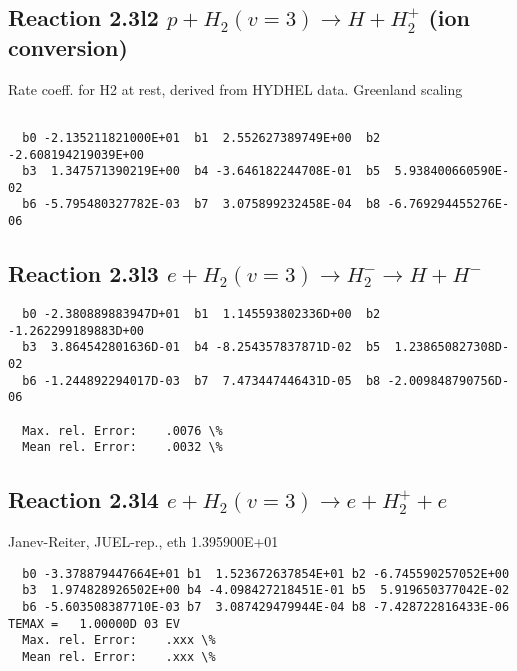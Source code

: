 \documentclass[12pt,dvipdfmx]{article}
\begin{document}
\subsection{
Reaction 2.3l2
$ p + H_2(v=3) \rightarrow H + H_2^+$ (ion conversion)
}
Rate coeff. for H2 at rest, derived from HYDHEL data. Greenland scaling


\begin{small}\begin{verbatim}

  b0 -2.135211821000E+01  b1  2.552627389749E+00  b2 -2.608194219039E+00
  b3  1.347571390219E+00  b4 -3.646182244708E-01  b5  5.938400660590E-02
  b6 -5.795480327782E-03  b7  3.075899232458E-04  b8 -6.769294455276E-06

\end{verbatim}\end{small}

\newpage

\subsection{
Reaction 2.3l3
 $ e + H_2(v=3) \rightarrow H_2^- \rightarrow H + H^-$
}


\begin{small}\begin{verbatim}
  b0 -2.380889883947D+01  b1  1.145593802336D+00  b2 -1.262299189883D+00
  b3  3.864542801636D-01  b4 -8.254357837871D-02  b5  1.238650827308D-02
  b6 -1.244892294017D-03  b7  7.473447446431D-05  b8 -2.009848790756D-06

  Max. rel. Error:    .0076 \%
  Mean rel. Error:    .0032 \%

\end{verbatim}\end{small}


\subsection{
Reaction 2.3l4
 $ e + H_2(v=3) \rightarrow e + H_2^+  + e $
}
Janev-Reiter, JUEL-rep., eth 1.395900E+01

\begin{small}\begin{verbatim}
  b0 -3.378879447664E+01 b1  1.523672637854E+01 b2 -6.745590257052E+00
  b3  1.974828926502E+00 b4 -4.098427218451E-01 b5  5.919650377042E-02
  b6 -5.603508387710E-03 b7  3.087429479944E-04 b8 -7.428722816433E-06
TEMAX =   1.00000D 03 EV
  Max. rel. Error:    .xxx \%
  Mean rel. Error:    .xxx \%
\end{verbatim}\end{small}
\end{document}

